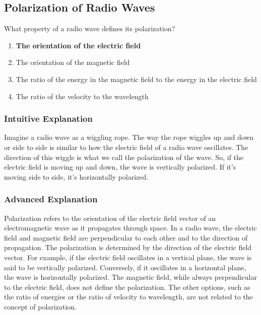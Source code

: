 \subsection{Polarization of Radio Waves}
\label{T3B02}

\begin{tcolorbox}[colback=gray!10!white,colframe=black!75!black,title=T3B02]
What property of a radio wave defines its polarization?
\begin{enumerate}[noitemsep]
    \item \textbf{The orientation of the electric field}
    \item The orientation of the magnetic field
    \item The ratio of the energy in the magnetic field to the energy in the electric field
    \item The ratio of the velocity to the wavelength
\end{enumerate}
\end{tcolorbox}

\subsubsection*{Intuitive Explanation}
Imagine a radio wave as a wiggling rope. The way the rope wiggles up and down or side to side is similar to how the electric field of a radio wave oscillates. The direction of this wiggle is what we call the polarization of the wave. So, if the electric field is moving up and down, the wave is vertically polarized. If it's moving side to side, it's horizontally polarized.

\subsubsection*{Advanced Explanation}
Polarization refers to the orientation of the electric field vector of an electromagnetic wave as it propagates through space. In a radio wave, the electric field and magnetic field are perpendicular to each other and to the direction of propagation. The polarization is determined by the direction of the electric field vector. For example, if the electric field oscillates in a vertical plane, the wave is said to be vertically polarized. Conversely, if it oscillates in a horizontal plane, the wave is horizontally polarized. The magnetic field, while always perpendicular to the electric field, does not define the polarization. The other options, such as the ratio of energies or the ratio of velocity to wavelength, are not related to the concept of polarization.

